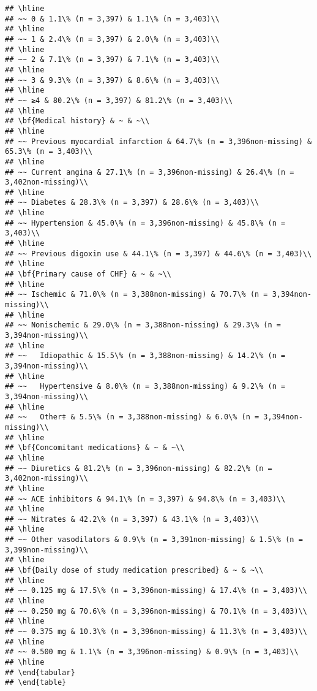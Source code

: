 \documentclass[
]{article}
\begin{document}
\begin{verbatim}
## \hline
## ~~ 0 & 1.1\% (n = 3,397) & 1.1\% (n = 3,403)\\
## \hline
## ~~ 1 & 2.4\% (n = 3,397) & 2.0\% (n = 3,403)\\
## \hline
## ~~ 2 & 7.1\% (n = 3,397) & 7.1\% (n = 3,403)\\
## \hline
## ~~ 3 & 9.3\% (n = 3,397) & 8.6\% (n = 3,403)\\
## \hline
## ~~ ≥4 & 80.2\% (n = 3,397) & 81.2\% (n = 3,403)\\
## \hline
## \bf{Medical history} & ~ & ~\\
## \hline
## ~~ Previous myocardial infarction & 64.7\% (n = 3,396non-missing) & 65.3\% (n = 3,403)\\
## \hline
## ~~ Current angina & 27.1\% (n = 3,396non-missing) & 26.4\% (n = 3,402non-missing)\\
## \hline
## ~~ Diabetes & 28.3\% (n = 3,397) & 28.6\% (n = 3,403)\\
## \hline
## ~~ Hypertension & 45.0\% (n = 3,396non-missing) & 45.8\% (n = 3,403)\\
## \hline
## ~~ Previous digoxin use & 44.1\% (n = 3,397) & 44.6\% (n = 3,403)\\
## \hline
## \bf{Primary cause of CHF} & ~ & ~\\
## \hline
## ~~ Ischemic & 71.0\% (n = 3,388non-missing) & 70.7\% (n = 3,394non-missing)\\
## \hline
## ~~ Nonischemic & 29.0\% (n = 3,388non-missing) & 29.3\% (n = 3,394non-missing)\\
## \hline
## ~~   Idiopathic & 15.5\% (n = 3,388non-missing) & 14.2\% (n = 3,394non-missing)\\
## \hline
## ~~   Hypertensive & 8.0\% (n = 3,388non-missing) & 9.2\% (n = 3,394non-missing)\\
## \hline
## ~~   Other‡ & 5.5\% (n = 3,388non-missing) & 6.0\% (n = 3,394non-missing)\\
## \hline
## \bf{Concomitant medications} & ~ & ~\\
## \hline
## ~~ Diuretics & 81.2\% (n = 3,396non-missing) & 82.2\% (n = 3,402non-missing)\\
## \hline
## ~~ ACE inhibitors & 94.1\% (n = 3,397) & 94.8\% (n = 3,403)\\
## \hline
## ~~ Nitrates & 42.2\% (n = 3,397) & 43.1\% (n = 3,403)\\
## \hline
## ~~ Other vasodilators & 0.9\% (n = 3,391non-missing) & 1.5\% (n = 3,399non-missing)\\
## \hline
## \bf{Daily dose of study medication prescribed} & ~ & ~\\
## \hline
## ~~ 0.125 mg & 17.5\% (n = 3,396non-missing) & 17.4\% (n = 3,403)\\
## \hline
## ~~ 0.250 mg & 70.6\% (n = 3,396non-missing) & 70.1\% (n = 3,403)\\
## \hline
## ~~ 0.375 mg & 10.3\% (n = 3,396non-missing) & 11.3\% (n = 3,403)\\
## \hline
## ~~ 0.500 mg & 1.1\% (n = 3,396non-missing) & 0.9\% (n = 3,403)\\
## \hline
## \end{tabular}
## \end{table}
\end{verbatim}
\end{document}
